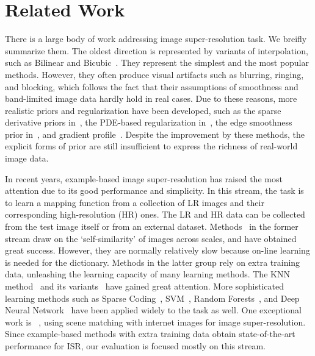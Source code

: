 \documentclass[10pt,twocolumn,letterpaper]{article}
\begin{document}
\section{Related Work}
\label{sec:relatedwork}
There is a large body of work addressing image super-resolution
task. We breifly summarize them. %
The oldest direction is represented by variants of interpolation, such
as Bilinear and
Bicubic~\cite{Duchon-JAM-1979,Thevenaz-BOOK-2000}. They represent the
simplest and the most popular methods. However, they often produce
visual artifacts such as blurring, ringing, and blocking, which
follows the fact that their assumptions of smoothness and band-limited
image data hardly hold in real cases. Due to these reasons, more
realistic priors and regularization have been developed, such as the
sparse derivative priors in~\cite{Tappen-WSCTV-2003}, the PDE-based
regularization in~\cite{Tschumperle-PAMI-2005}, the edge
smoothness prior in~\cite{Dai-CVPR-2007}, and gradient profile~\cite{Sun-CVPR-2008}. Despite the improvement by
these methods, the explicit forms of prior are still insufficient to
express the richness of real-world image data.

In recent years, example-based image super-resolution has raised the
most attention due to its good performance and simplicity. In this
stream, the task is to learn a mapping function from a collection of
LR images and their corresponding high-resolution (HR) ones. The LR and HR data can be
collected from the test image itself or from an external dataset.
Methods~\cite{Freedman-TOG-2011, Glasner-ICCV-2009, selfsimaccv, Huang_2015_CVPR}
in the former stream draw on the `self-similarity' of images across scales,
and have obtained great success. However, they are normally relatively slow because on-line learning is needed for the dictionary. 
Methods in the latter group rely on extra training data, unleashing the learning capacity
of many learning methods. The KNN method~\cite{Freeman-CGA-2002}
and its variants~\cite{Chang-CVPR-2004, Yang-ICCV-2013, JOR:EG15, dai:MI}
have gained great attention. More sophisticated learning methods such as Sparse Coding~\cite{Yang-TIP-2010,  Kim-PAMI-2010, Timofte-ICCV-2013, Timofte-ACCV-2014,  deeply:improved},
SVM~\cite{ISR:SVM}, Random Forests~\cite{SR_forest, NBSRF, cSRF}, and Deep Neural Network~\cite{Dong-ECCV-2014, deep:cascade, deeply:improved} have been applied widely to the task as well.
One exceptional work is ~\cite{ISR:internet}, using scene matching with internet images for image super-resolution.
Since example-based methods with extra training data obtain state-of-the-art performance for ISR, our 
evaluation is focused mostly on this stream.
\end{document}
